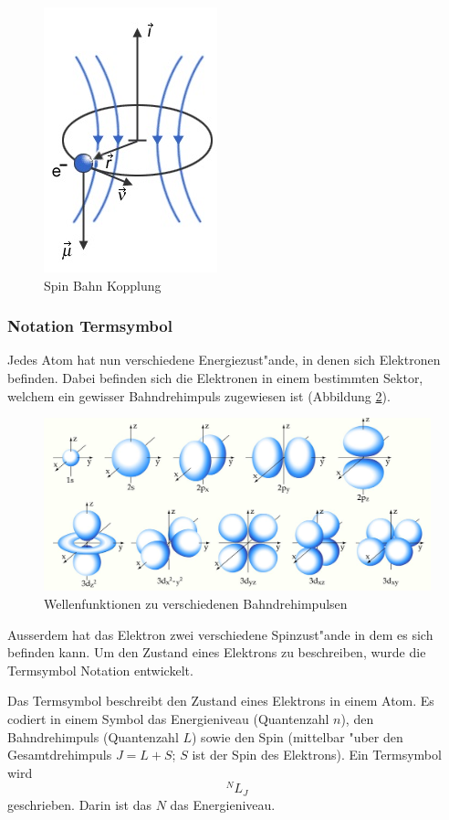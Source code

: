 \begin{refsection}
\begin{figure}
	\centering
	\includegraphics[width=.2\columnwidth]{atomuhr/feinstrukturelektron.jpg}
	\caption{Spin Bahn Kopplung \cite{pic:feinstruktur}}
	\label{atomuhr:spinbahn}
\end{figure}

\subsubsection{Notation Termsymbol}
%
Jedes Atom hat nun verschiedene Energiezust"ande, in denen sich
Elektronen befinden.  Dabei befinden sich die Elektronen in einem
bestimmten Sektor, welchem ein gewisser Bahndrehimpuls zugewiesen ist
(Abbildung \ref{atomuhr:bahndrehimpuls}).
\begin{figure}
	\centering
	\includegraphics[width = 0.8\columnwidth]{atomuhr/orbitale.JPG}
	\caption{Wellenfunktionen zu verschiedenen Bahndrehimpulsen \cite{pic:orbitale}}
	\label{atomuhr:bahndrehimpuls}
\end{figure}
Ausserdem hat das Elektron zwei verschiedene Spinzust"ande in dem es
sich befinden kann.  Um den Zustand eines Elektrons zu beschreiben,
wurde die Termsymbol Notation entwickelt.

Das Termsymbol beschreibt den Zustand eines Elektrons in einem
Atom. Es codiert in einem Symbol das Energieniveau (Quantenzahl
\(n\)), den Bahndrehimpuls (Quantenzahl \(L\)) sowie den Spin
(mittelbar "uber den Gesamtdrehimpuls \(J=L+S\); \(S\) ist der Spin
des Elektrons).  Ein Termsymbol wird
\begin{equation}
	^NL _J
\end{equation}
geschrieben.  Darin ist das \(N\) das Energieniveau.


\end{refsection}
